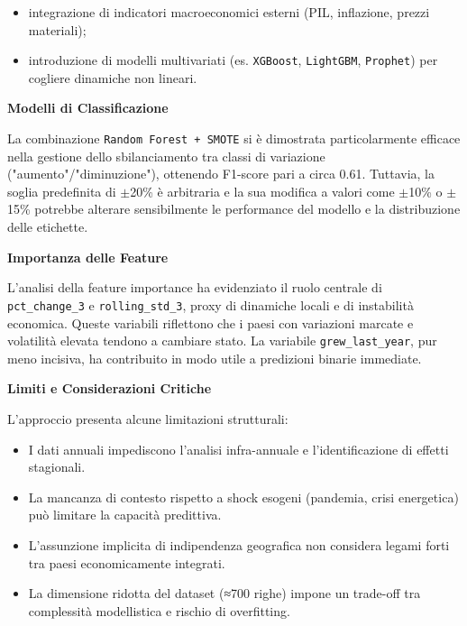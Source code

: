 \documentclass[conference]{IEEEtran}
\begin{document}
{\begin{itemize} \item integrazione di indicatori macroeconomici esterni (PIL, inflazione, prezzi materiali); \item introduzione di modelli multivariati (es. \texttt{XGBoost}, \texttt{LightGBM}, \texttt{Prophet}) per cogliere dinamiche non lineari. \end{itemize}

\vspace{1em}\noindent\textbf{Modelli di Classificazione}

La combinazione \texttt{Random Forest + SMOTE} si è dimostrata particolarmente efficace nella gestione dello sbilanciamento tra classi di variazione ("aumento"/"diminuzione"), ottenendo F1-score pari a circa 0.61. Tuttavia, la soglia predefinita di $\pm$20\% è arbitraria e la sua modifica a valori come $\pm$10\% o $\pm$15\% potrebbe alterare sensibilmente le performance del modello e la distribuzione delle etichette.

\vspace{1em}\noindent\textbf{Importanza delle Feature}

L’analisi della feature importance ha evidenziato il ruolo centrale di \texttt{pct\_change\_3} e \texttt{rolling\_std\_3}, proxy di dinamiche locali e di instabilità economica. Queste variabili riflettono che i paesi con variazioni marcate e volatilità elevata tendono a cambiare stato. La variabile \texttt{grew\_last\_year}, pur meno incisiva, ha contribuito in modo utile a predizioni binarie immediate.

\vspace{1em}\noindent\textbf{Limiti e Considerazioni Critiche}

L’approccio presenta alcune limitazioni strutturali: \begin{itemize} \item I dati annuali impediscono l’analisi infra-annuale e l’identificazione di effetti stagionali. \item La mancanza di contesto rispetto a shock esogeni (pandemia, crisi energetica) può limitare la capacità predittiva. \item L’assunzione implicita di indipendenza geografica non considera legami forti tra paesi economicamente integrati. \item La dimensione ridotta del dataset (≈700 righe) impone un trade-off tra complessità modellistica e rischio di overfitting. \end{itemize}

}
\end{document}
